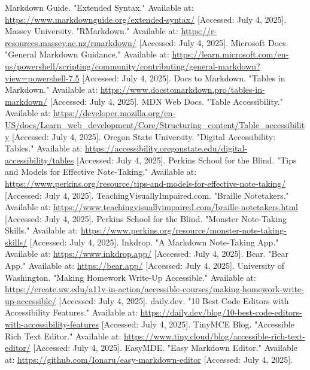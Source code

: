 \begin{thebibliography}{99}
 Markdown Guide. "Extended Syntax." Available at: \url{https://www.markdownguide.org/extended-syntax/} [Accessed: July 4, 2025].
 Massey University. "RMarkdown." Available at: \url{https://r-resources.massey.ac.nz/rmarkdown/} [Accessed: July 4, 2025].
 Microsoft Docs. "General Markdown Guidance." Available at: \url{https://learn.microsoft.com/en-us/powershell/scripting/community/contributing/general-markdown?view=powershell-7.5} [Accessed: July 4, 2025].
 Docs to Markdown. "Tables in Markdown." Available at: \url{https://www.docstomarkdown.pro/tables-in-markdown/} [Accessed: July 4, 2025].
 MDN Web Docs. "Table Accessibility." Available at: \url{https://developer.mozilla.org/en-US/docs/Learn_web_development/Core/Structuring_content/Table_accessibility} [Accessed: July 4, 2025].
 Oregon State University. "Digital Accessibility: Tables." Available at: \url{https://accessibility.oregonstate.edu/digital-accessibility/tables} [Accessed: July 4, 2025].
 Perkins School for the Blind. "Tips and Models for Effective Note-Taking." Available at: \url{https://www.perkins.org/resource/tips-and-models-for-effective-note-taking/} [Accessed: July 4, 2025].
 TeachingVisuallyImpaired.com. "Braille Notetakers." Available at: \url{https://www.teachingvisuallyimpaired.com/braille-notetakers.html} [Accessed: July 4, 2025].
 Perkins School for the Blind. "Monster Note-Taking Skills." Available at: \url{https://www.perkins.org/resource/monster-note-taking-skills/} [Accessed: July 4, 2025].
 Inkdrop. "A Markdown Note-Taking App." Available at: \url{https://www.inkdrop.app/} [Accessed: July 4, 2025].
 Bear. "Bear App." Available at: \url{https://bear.app/} [Accessed: July 4, 2025].
 University of Washington. "Making Homework Write-Up Accessible." Available at: \url{https://create.uw.edu/a11y-in-action/accessible-courses/making-homework-write-up-accessible/} [Accessed: July 4, 2025].
 daily.dev. "10 Best Code Editors with Accessibility Features." Available at: \url{https://daily.dev/blog/10-best-code-editors-with-accessibility-features} [Accessed: July 4, 2025].
 TinyMCE Blog. "Accessible Rich Text Editor." Available at: \url{https://www.tiny.cloud/blog/accessible-rich-text-editor/} [Accessed: July 4, 2025].
 EasyMDE. "Easy Markdown Editor." Available at: \url{https://github.com/Ionaru/easy-markdown-editor} [Accessed: July 4, 2025].


\end{thebibliography}
